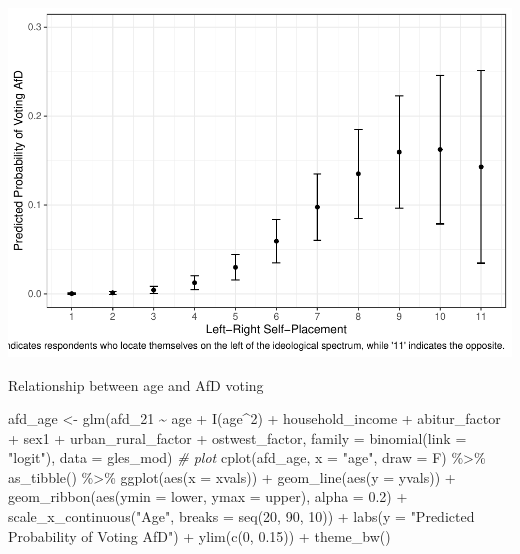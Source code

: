 \documentclass[
]{article}
\newenvironment{Shaded}{\begin{snugshade}}{\end{snugshade}}
\newcommand{\AttributeTok}[1]{\textcolor[rgb]{0.77,0.63,0.00}{#1}}
\newcommand{\CommentTok}[1]{\textcolor[rgb]{0.56,0.35,0.01}{\textit{#1}}}
\newcommand{\DecValTok}[1]{\textcolor[rgb]{0.00,0.00,0.81}{#1}}
\newcommand{\FloatTok}[1]{\textcolor[rgb]{0.00,0.00,0.81}{#1}}
\newcommand{\FunctionTok}[1]{\textcolor[rgb]{0.00,0.00,0.00}{#1}}
\newcommand{\NormalTok}[1]{#1}
\newcommand{\OtherTok}[1]{\textcolor[rgb]{0.56,0.35,0.01}{#1}}
\newcommand{\SpecialCharTok}[1]{\textcolor[rgb]{0.00,0.00,0.00}{#1}}
\newcommand{\StringTok}[1]{\textcolor[rgb]{0.31,0.60,0.02}{#1}}
\begin{document}
\includegraphics{AVCD_Final_Assignment-Edenhofer_files/figure-latex/afd-left-right-self-placement-1.pdf}

Relationship between age and AfD voting

\begin{Shaded}
\begin{Highlighting}[]
\NormalTok{afd\_age }\OtherTok{\textless{}{-}} \FunctionTok{glm}\NormalTok{(afd\_21 }\SpecialCharTok{\textasciitilde{}}\NormalTok{ age }\SpecialCharTok{+} \FunctionTok{I}\NormalTok{(age}\SpecialCharTok{\^{}}\DecValTok{2}\NormalTok{) }\SpecialCharTok{+}\NormalTok{ household\_income }\SpecialCharTok{+}\NormalTok{ abitur\_factor }\SpecialCharTok{+}\NormalTok{ sex1 }\SpecialCharTok{+}\NormalTok{ urban\_rural\_factor }\SpecialCharTok{+}\NormalTok{ ostwest\_factor, }\AttributeTok{family =} \FunctionTok{binomial}\NormalTok{(}\AttributeTok{link =} \StringTok{"logit"}\NormalTok{), }\AttributeTok{data =}\NormalTok{ gles\_mod)}
\CommentTok{\# plot }
\FunctionTok{cplot}\NormalTok{(afd\_age, }\AttributeTok{x =} \StringTok{"age"}\NormalTok{, }\AttributeTok{draw =}\NormalTok{ F) }\SpecialCharTok{\%\textgreater{}\%}
  \FunctionTok{as\_tibble}\NormalTok{() }\SpecialCharTok{\%\textgreater{}\%}
  \FunctionTok{ggplot}\NormalTok{(}\FunctionTok{aes}\NormalTok{(}\AttributeTok{x =}\NormalTok{ xvals)) }\SpecialCharTok{+}
  \FunctionTok{geom\_line}\NormalTok{(}\FunctionTok{aes}\NormalTok{(}\AttributeTok{y =}\NormalTok{ yvals)) }\SpecialCharTok{+}
  \FunctionTok{geom\_ribbon}\NormalTok{(}\FunctionTok{aes}\NormalTok{(}\AttributeTok{ymin =}\NormalTok{ lower, }\AttributeTok{ymax =}\NormalTok{ upper), }\AttributeTok{alpha =} \FloatTok{0.2}\NormalTok{) }\SpecialCharTok{+}
  \FunctionTok{scale\_x\_continuous}\NormalTok{(}\StringTok{"Age"}\NormalTok{, }\AttributeTok{breaks =} \FunctionTok{seq}\NormalTok{(}\DecValTok{20}\NormalTok{, }\DecValTok{90}\NormalTok{, }\DecValTok{10}\NormalTok{)) }\SpecialCharTok{+}
  \FunctionTok{labs}\NormalTok{(}\AttributeTok{y =} \StringTok{"Predicted Probability of Voting AfD"}\NormalTok{) }\SpecialCharTok{+}
  \FunctionTok{ylim}\NormalTok{(}\FunctionTok{c}\NormalTok{(}\DecValTok{0}\NormalTok{, }\FloatTok{0.15}\NormalTok{)) }\SpecialCharTok{+}
  \FunctionTok{theme\_bw}\NormalTok{()}
\end{Highlighting}
\end{Shaded}
\end{document}
